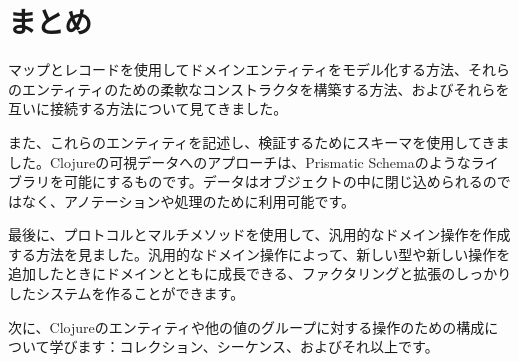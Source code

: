 \section{まとめ}


マップとレコードを使用してドメインエンティティをモデル化する方法、それらのエンティティのための柔軟なコンストラクタを構築する方法、およびそれらを互いに接続する方法について見てきました。

また、これらのエンティティを記述し、検証するためにスキーマを使用してきました。Clojureの可視データへのアプローチは、Prismatic Schemaのようなライブラリを可能にするものです。データはオブジェクトの中に閉じ込められるのではなく、アノテーションや処理のために利用可能です。

最後に、プロトコルとマルチメソッドを使用して、汎用的なドメイン操作を作成する方法を見ました。汎用的なドメイン操作によって、新しい型や新しい操作を追加したときにドメインとともに成長できる、ファクタリングと拡張のしっかりしたシステムを作ることができます。

次に、Clojureのエンティティや他の値のグループに対する操作のための構成について学びます：コレクション、シーケンス、およびそれ以上です。

